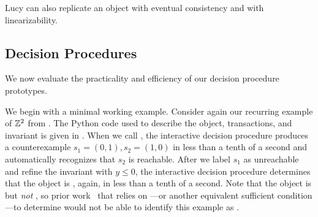 Lucy can also replicate an object with eventual consistency and with
linearizability.


\subsection{Decision Procedures}
We now evaluate the practicality and efficiency of our decision procedure
prototypes.



\example[$\ints^2$]
We begin with a minimal working example. Consider again our recurring example
of $\ints^2$ from . The Python code used to describe the object,
transactions, and invariant is given in . When we call
, the interactive decision procedure produces a
counterexample $s_1 = (0, 1), s_2 = (1, 0)$ in less than a tenth of a second
and automatically recognizes that $s_2$ is reachable. After we label $s_1$ as
unreachable and refine the invariant with $y \leq 0$, the interactive decision
procedure determines that the object is \invariantconfluent{}, again, in less
than a tenth of a second. Note that the object is \invariantconfluent{} but
\emph{not} \invariantclosed{}, so prior work~\cite{li2012making,
li2014automating, balegas2015towards, gotsman2016cause} that relies on
\invariantclosure{}---or another equivalent sufficient condition---to determine
\invariantconfluence{} would not be able to identify this example as
\invariantconfluent{}.

